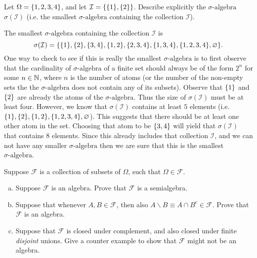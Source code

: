 \begin{problem}
	Let $ \Omega = \{1,2,3,4\} $, and let $ \mathcal{I} = \{\{1\},\{2\}\} $. Describe explicitly the $\sigma\text{-algebra}$ $ \sigma(\mathcal{I}) $ (i.e. the smallest $\sigma\text{-algebra}$ containing the collection $ \mathcal{I} $).
\end{problem}
\begin{solution}
	The smallest $\sigma\text{-algebra}$ containing the collection $ \mathcal{I} $ is
	\[ \sigma(\mathcal{I}) = \{\{1\},\{2\},\{3,4\},\{1,2\},\{2,3,4\},\{1,3,4\},\{1,2,3,4\},\varnothing\}. \]
	One way to check to see if this is really the smallest $\sigma\text{-algebra}$ is to first observe that the cardinality of $\sigma\text{-algebra}$ of a finite set should always be of the form $ 2^n $ for some $ n \in \mathbb{N} $, where $ n $ is the number of atoms (or the number of the non-empty sets the the $\sigma\text{-algebra}$ does not contain any of its subsets). Observe that $ \{1\} $ and $ \{2\} $ are already the atoms of the $\sigma\text{-algebra}$. Thus the size of $ \sigma(\mathcal{I}) $ must be at least four. However, we know that $ \sigma(\mathcal{I}) $ contains at least $ 5 $ elements (i.e. $ \{1\},\{2\},\{1,2\},\{1,2,3,4\},\varnothing $). This suggests that there should be at least one other atom in the set. Choosing that atom to be $ \{3,4\} $ will yield that $ \sigma(\mathcal{I}) $ that contains $ 8 $ elements. Since this already includes that collection $ \mathcal{I} $, and we can not have any smaller $\sigma\text{-algebra}$ then we are sure that this is the smallest $\sigma\text{-algebra}$.
\end{solution}


\begin{problem}
	Suppose $ \mathcal{F} $ is a collection of subsets of $ \Omega $, such that $ \Omega \in \mathcal{F} $.
	\begin{enumerate}[(a)]
		\item Suppose $ \mathcal{F} $ is an algebra. Prove that $ \mathcal{F} $ is a semialgebra.
		\item Suppose that whenever $ A,B \in \mathcal{F} $, then also $ A\backslash B \equiv A \cap B^c \in \mathcal{F} $. Prove that $ \mathcal{F} $ is an algebra. 
		\item Suppose that $ \mathcal{F} $ is closed under complement, and also closed under finite \emph{disjoint} unions. Give a counter example to show that $ \mathcal{F} $ might not be an algebra. 
	\end{enumerate}
\end{problem}

